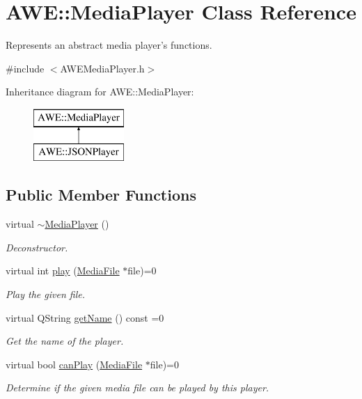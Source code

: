 \hypertarget{class_a_w_e_1_1_media_player}{\section{A\-W\-E\-:\-:Media\-Player Class Reference}
\label{class_a_w_e_1_1_media_player}
}


Represents an abstract media player's functions.  




{\ttfamily \#include $<$A\-W\-E\-Media\-Player.\-h$>$}

Inheritance diagram for A\-W\-E\-:\-:Media\-Player\-:\begin{figure}[H]
\begin{center}
\leavevmode
\includegraphics[height=2.000000cm]{class_a_w_e_1_1_media_player}
\end{center}
\end{figure}
\subsection*{Public Member Functions}
\begin{DoxyCompactItemize}
\item 
\hypertarget{class_a_w_e_1_1_media_player_af4e56a79d4ee564e0337a6b5c0bbf592}{virtual \hyperlink{class_a_w_e_1_1_media_player_af4e56a79d4ee564e0337a6b5c0bbf592}{$\sim$\-Media\-Player} ()}\label{class_a_w_e_1_1_media_player_af4e56a79d4ee564e0337a6b5c0bbf592}

\begin{DoxyCompactList}\small\item\em Deconstructor. \end{DoxyCompactList}\item 
virtual int \hyperlink{class_a_w_e_1_1_media_player_a8a7660cdf7306adf61a7c79831ee7171}{play} (\hyperlink{class_a_w_e_1_1_media_file}{Media\-File} $\ast$file)=0
\begin{DoxyCompactList}\small\item\em Play the given file. \end{DoxyCompactList}\item 
virtual Q\-String \hyperlink{class_a_w_e_1_1_media_player_a481bc1288b8b3bde9c5116d7ffd3c2f2}{get\-Name} () const =0
\begin{DoxyCompactList}\small\item\em Get the name of the player. \end{DoxyCompactList}\item 
virtual bool \hyperlink{class_a_w_e_1_1_media_player_a8dd37e3307cef837b296f94e4b398138}{can\-Play} (\hyperlink{class_a_w_e_1_1_media_file}{Media\-File} $\ast$file)=0
\begin{DoxyCompactList}\small\item\em Determine if the given media file can be played by this player. \end{DoxyCompactList}\end{DoxyCompactItemize}


